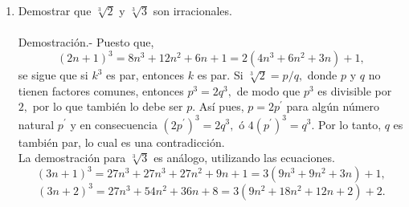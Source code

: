 \begin{teo}
\begin{enumerate}[\bfseries a)]
\item Demostrar que $\sqrt[3]{2}$ y $\sqrt[3]{3}$ son irracionales.\\\\
Demostración.- \; Puesto que,
$$(2n+1)^3 = 8n^3 + 12n^2 + 6n + 1 = 2(4n^3 + 6n^2 + 3n) + 1,$$
se sigue que si $k^3$ es par, entonces $k$ es par. Si $\sqrt[3]{2} = p/q,$ donde $p$ \; y \; $q$ no tienen factores comunes, entonces $p^3 = 2q^3,$ de modo que $p^3$ es divisible por $2,$ por lo que también lo debe ser $p.$ Así pues, $p=2p^{'}$ para algún número natural $p^{'}$ y en consecuencia $(2p^{'})^3 = 2q^3,$ ó $4(p^{'})^3 = q^3.$ Por lo tanto, $q$ es también par, lo cual es una contradicción.\\
La demostración para $\sqrt[3]{3}$ es análogo, utilizando las ecuaciones.
$$(3n+1)^3 = 27n^3 + 27n^3 + 27n^2 + 9n +1 = 3(9n^3 + 9n^2 + 3n) + 1,$$
$$(3n+2)^3 = 27n^3 + 54n^2 + 36n + 8 = 3(9n^2 + 18n^2 + 12n + 2) + 2.$$\\\\
\end{enumerate}
\end{teo}

